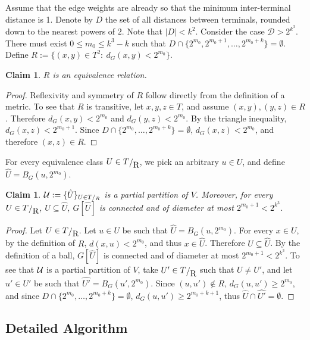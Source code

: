 \documentclass[twoside,leqno,twocolumn]{article}
\newtheorem{claim}[lemma]{Claim}
\newtheorem{claim}[theorem]{Claim}
\providecommand{\eqdef}{:=}
\newcommand{\calD}{{\mathcal D}}
\begin{document}
Assume that the edge weights are already so that the minimum inter-terminal distance is 1. Denote by $D$ the set of all distances between terminals, rounded down to the nearest powers of $2$. Note that $|D| < k^2$. Consider the case $\calD > 2^{k^3}$. There must exist $0 \le m_0 \le k^3-k$ such that $D \cap \{2^{m_0},2^{m_0+1},\ldots,2^{m_0+k}\} = \emptyset$.
Define $R \eqdef \{(x,y) \in T^2 : \ d_G(x,y) < 2^{m_0} \}$. 
\begin{claim} \label{c:equivR}
$R$ is an equivalence relation.
\end{claim}
\begin{proof}
Reflexivity and symmetry of $R$ follow directly from the definition of a metric. To see that $R$ is transitive, let $x,y,z \in T$, and assume $(x,y),(y,z) \in R$. Therefore $d_G(x,y) < 2^{m_0}$ and $d_G(y,z)<2^{m_0}$. By the triangle inequality, $d_G(x,z)<2^{m_0+1}$. Since $D \cap \{2^{m_0},\ldots,2^{m_0+k}\} = \emptyset$, $d_G(x,z)<2^{m_0}$, and therefore $(x,z)\in R$.
\end{proof}
For every equivalence class $U \in T\raisebox{-.1em}{/}\raisebox{-.4em}{R}$, we pick an arbitrary $u \in U$, and define $\hat{U} = B_G(u,2^{m_0})$.
\begin{claim}\label{c:sepBalls}
${\cal U} \eqdef \{\hat{U}\}_{U \in T/_R}$ is a partial partition of $V$. Moreover, for every $U \in T\raisebox{-.1em}{/}\raisebox{-.4em}{R}$, $U \subseteq \hat{U}$, $G[\hat{U}]$ is connected and of diameter at most $2^{m_0+1}<2^{k^3}$.
\end{claim}
\begin{proof}
Let $U \in T\raisebox{-.1em}{/}\raisebox{-.4em}{R}$. Let $u \in U$ be such that $\hat{U}=B_G(u,2^{m_0})$. For every $x \in U$, by the definition of $R$, $d(x,u) < 2^{m_0}$, and thus $x \in \hat{U}$. Therefore $U \subseteq \hat{U}$. By the definition of a ball, $G[\hat{U}]$ is connected and of diameter at most $2^{m_0+1}<2^{k^3}$.
To see that ${\cal U}$ is a partial partition of $V$, take $U' \in T\raisebox{-.1em}{/}\raisebox{-.4em}{R}$ such that $U \ne U'$, and let $u' \in U'$ be such that $\hat{U'}=B_G(u',2^{m_0})$. Since $(u,u') \notin R$, $d_G(u,u') \ge 2^{m_0}$, and since 
$D \cap \{2^{m_0},\ldots,2^{m_0+k}\} = \emptyset$, $d_G(u,u') \ge 2^{m_0+k+1}$, thus $\hat{U} \cap \hat{U'} = \emptyset$.
\end{proof}


\subsection{Detailed Algorithm}\label{sec:general-alg}
\end{document}
